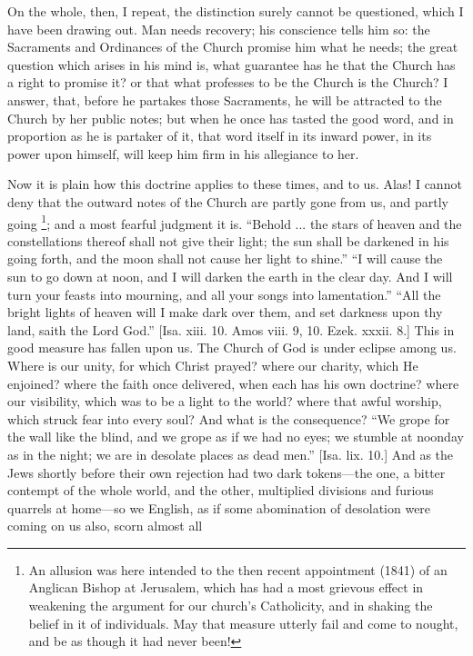 On the whole, then, I repeat, the distinction surely cannot be
questioned, which I have been drawing out. Man needs recovery; his
conscience tells him so: the Sacraments and Ordinances of the Church
promise him what he needs; the great question which arises in his mind
is, what guarantee has he that the Church has a right to promise it?
or that what professes to be the Church is the Church? I answer, that,
before he partakes those Sacraments, he will be attracted to the
Church by her public notes; but when he once has tasted the good word,
and in proportion as he is partaker of it, that word itself in its
inward power, in its power upon himself, will keep him firm in his
allegiance to her.

Now it is plain how this doctrine applies to these times, and to
us. Alas! I cannot deny that the outward notes of the Church are
partly gone from us, and partly going \footnote{An allusion was here intended to the then recent appointment
(1841) of an Anglican Bishop at Jerusalem, which has had a most
grievous effect in weakening the argument for our church's
Catholicity, and in shaking the belief in it of individuals. May that
measure utterly fail and come to nought, and be as though it had never
been!}; and a most fearful judgment it is. ``Behold ... the stars
of heaven and the constellations thereof shall not give their light;
the sun shall be darkened in his going forth, and the moon shall not
cause her light to shine.'' ``I will cause the sun to go down
at noon, and I will darken the earth in the clear day. And I will turn
your feasts into mourning, and all your songs into lamentation.''
``All the bright lights of heaven will I make dark over them, and
set darkness upon thy land, saith the Lord God.'' [Isa. xiii. 10.
Amos viii. 9, 10. Ezek. xxxii. 8.] This in good measure has fallen
upon us. The Church of God is under eclipse among us. Where is our
unity, for which Christ prayed? where our charity, which He enjoined?
where the faith once delivered, when each has his own doctrine? where
our visibility, which was to be a light to the world? where that awful
worship, which struck fear into every soul? And what is the
consequence? ``We grope for the wall like the blind, and we grope
as if we had no eyes; we stumble at noonday as in the night; we are in
desolate places as dead men.'' [Isa. lix. 10.] And as the Jews
shortly before their own rejection had two dark tokens—the one, a
bitter contempt of the whole world, and the other, multiplied
divisions and furious quarrels at home—so we English, as if some
abomination of desolation were coming on us also, scorn almost all
